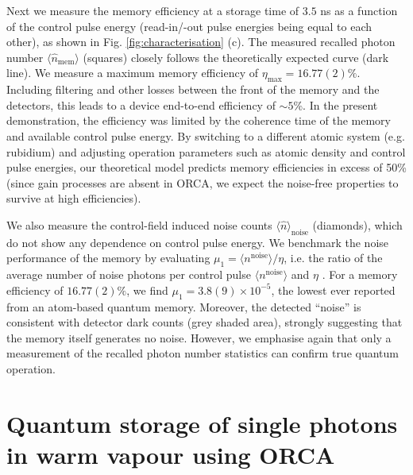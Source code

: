 \documentclass[%
 reprint,
 amsmath,amssymb,
 aps,
 pra,
]{revtex4-1}
\begin{document}
Next we measure the memory efficiency at a storage time of $3.5$ ns as a function of the control pulse energy (read-in/-out pulse energies being equal to each other), as shown in Fig. \ref{fig:characterisation} (c). The measured recalled photon number $\langle\hat{n}_\mathrm{mem}\rangle$ (squares) closely follows the theoretically expected curve (dark line). We measure a maximum memory efficiency of $\eta_\mathrm{max}=16.77(2)\%$. Including filtering and other losses between the front of the memory and the detectors, this leads to a device end-to-end efficiency of $\sim 5$\%. In the present demonstration, the efficiency was limited by the coherence time of the memory and available control pulse energy. By switching to a different atomic system (e.g. rubidium) and adjusting operation parameters such as atomic density and control pulse energies, our theoretical model predicts memory efficiencies in excess of 50\% (since gain processes \cite{Thomas2016} are absent in ORCA, we expect the noise-free properties to survive at high efficiencies).

We also measure the control-field induced noise counts $\langle\hat{n}\rangle_\mathrm{noise}$ (diamonds), which do not show any dependence on control pulse energy. We benchmark the noise performance of the memory by evaluating $\mu_1=\langle n^\mathrm{noise}\rangle/\eta$, i.e. the ratio of the average number of noise photons per control pulse $\langle n^\mathrm{noise}\rangle$ and $\eta$ \cite{Gundogan2015}. For a memory efficiency of $16.77(2)\%$, we find $\mu_1=3.8(9)\times10^{-5}$, the lowest ever reported from an atom-based quantum memory. Moreover, the detected ``noise'' is consistent with detector dark counts (grey shaded area), strongly suggesting that the memory itself generates no noise. However, we emphasise again that only a measurement of the recalled photon number statistics can confirm true quantum operation.

\section{Quantum storage of single photons in warm vapour using ORCA}
\end{document}
